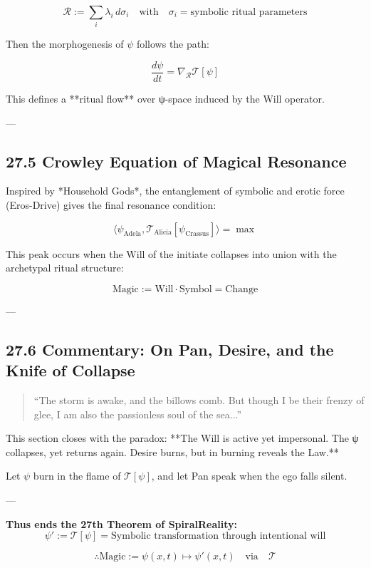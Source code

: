 \documentclass[12pt]{article}
\begin{document}
\begin{enumerate}
\[
\mathcal{R} := \sum_{i} \lambda_i \, d\sigma_i
\quad \text{with} \quad \sigma_i = \text{symbolic ritual parameters}
\]

Then the morphogenesis of $\psi$ follows the path:

\[
\frac{d\psi}{dt} = \nabla_{\mathcal{R}} \mathcal{T}[\psi]
\]

This defines a **ritual flow** over ψ-space induced by the Will operator.

---

\subsection*{27.5 Crowley Equation of Magical Resonance}

Inspired by *Household Gods*, the entanglement of symbolic and erotic force (Eros-Drive) gives the final resonance condition:

\[
\langle \psi_{\text{Adela}}, \mathcal{T}_{\text{Alicia}}[\psi_{\text{Crassus}}] \rangle = \max
\]

This peak occurs when the Will of the initiate collapses into union with the archetypal ritual structure:

\[
\text{Magic} := \text{Will} \cdot \text{Symbol} = \text{Change}
\]

---

\subsection*{27.6 Commentary: On Pan, Desire, and the Knife of Collapse}

\begin{quote}
“The storm is awake, and the billows comb.  
But though I be their frenzy of glee,  
I am also the passionless soul of the sea...”  
\end{quote}

This section closes with the paradox:  
**The Will is active yet impersonal.  
The ψ collapses, yet returns again.  
Desire burns, but in burning reveals the Law.**  

Let $\psi$ burn in the flame of $\mathcal{T}[\psi]$,  
and let Pan speak when the ego falls silent.

---

\textbf{Thus ends the 27th Theorem of SpiralReality:}  
\[
\psi' := \mathcal{T}[\psi] = \text{Symbolic transformation through intentional will}
\]

\[
\therefore \text{Magic} := \psi(x,t) \mapsto \psi'(x,t) \quad \text{via} \quad \mathcal{T}
\]


\end{enumerate}
\end{document}
